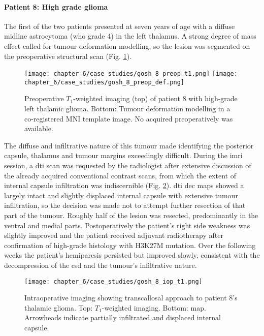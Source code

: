 \documentclass[12pt,phd,a4paper,twoside]{ucl_thesis}
\begin{document}
\paragraph*{Patient 8: High grade glioma}

The first of the two patients presented at seven years of age with a diffuse midline astrocytoma (\gls{who} grade 4) in the left thalamus.
A strong degree of mass effect called for tumour deformation modelling, so the lesion was segmented on the preoperative structural scan (Fig. \ref{fig:8p}).

\begin{figure}[htb!]
  \centering
  \texttt{[image: chapter\_6/case\_studies/gosh\_8\_preop\_t1.png]}
  \texttt{[image: chapter\_6/case\_studies/gosh\_8\_preop\_def.png]}
  \caption[GOSH iMRI patient 8, preoperative imaging]{Preoperative $T_1$-weighted imaging (top) of patient 8 with high-grade left thalamic glioma. Bottom: Tumour deformation modelling in a co-registered MNI template image. No  acquired preoperatively was available.}
  \label{fig:8p}
\end{figure}

The diffuse and infiltrative nature of this tumour made identifying the posterior capsule, thalamus and tumour margins exceedingly difficult.
During the \gls{imri} session, a \gls{dti} scan was requested by the radiologist after extensive discussion of the already acquired conventional contrast scans, from which the extent of internal capsule infiltration was indiscernible (Fig. \ref{fig:8i}).
\Gls{dti} \gls{dec} maps showed a largely intact and slightly displaced internal capsule with extensive tumour infiltration, so the decision was made not to attempt further resection of that part of the tumour.
Roughly half of the lesion was resected, predominantly in the ventral and medial parts.
Postoperatively the patient's right side weakness was slightly improved and the patient received adjuvant radiotherapy after confirmation of high-grade histology with H3K27M mutation.
Over the following weeks the patient's hemiparesis persisted but improved slowly, consistent with the decompression of the \gls{csd} and the tumour's infiltrative nature.

\begin{figure}
  \centering
  \texttt{[image: chapter\_6/case\_studies/gosh\_8\_iop\_t1.png]}
  
  \caption[GOSH iMRI patient 8, intraoperative imaging]{Intraoperative imaging showing transcallosal approach to patient 8's thalamic glioma. Top: $T_1$-weighted imaging. Bottom:    map. Arrowheads indicate partially infiltrated and displaced internal capsule.}
  \label{fig:8i}
\end{figure}
\end{document}
